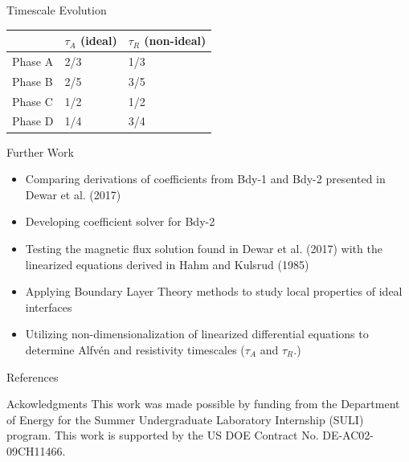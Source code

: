 \documentclass{beamer}
\begin{document}
\begin{frame}[t]
\begin{textblock}{15}
{\begin{block}{Timescale Evolution}
\begin{center}
\begin{tabular}{|l|l|l|}
    \hline
        & $\tau_A$ (ideal) & $\tau_R$ (non-ideal) \\
    \hline
        Phase A & 2/3 & 1/3 \\
    \hline
        Phase B & 2/5 & 3/5 \\
    \hline
        Phase C & 1/2 & 1/2 \\
    \hline
        Phase D & 1/4 & 3/4 \\
    \hline
\end{tabular}
\end{center}
\end{block}

\begin{block}{Further Work}
\begin{itemize}
    \item Comparing derivations of coefficients from Bdy-1 and Bdy-2 presented in Dewar et al. (2017)
    \item Developing coefficient solver for Bdy-2
    \item Testing the magnetic flux solution found in Dewar et al. (2017) with the linearized equations derived in Hahm and Kulsrud (1985)
    \item Applying Boundary Layer Theory methods to study local properties of ideal interfaces
    \item Utilizing non-dimensionalization of linearized differential equations to determine Alfvén and resistivity timescales ($\tau_A$ and $\tau_R$.)
\end{itemize}
\end{block}
}
\begin{block}{References}
\nocite{lazerson}

\end{block}
\begin{block}{Ackowledgments}
This work was made possible by funding from the Department of Energy for the Summer Undergraduate Laboratory Internship (SULI) program. This work is supported by the US DOE Contract No. DE-AC02-09CH11466.
\end{block}
\end{textblock}
\end{frame}
\end{document}
